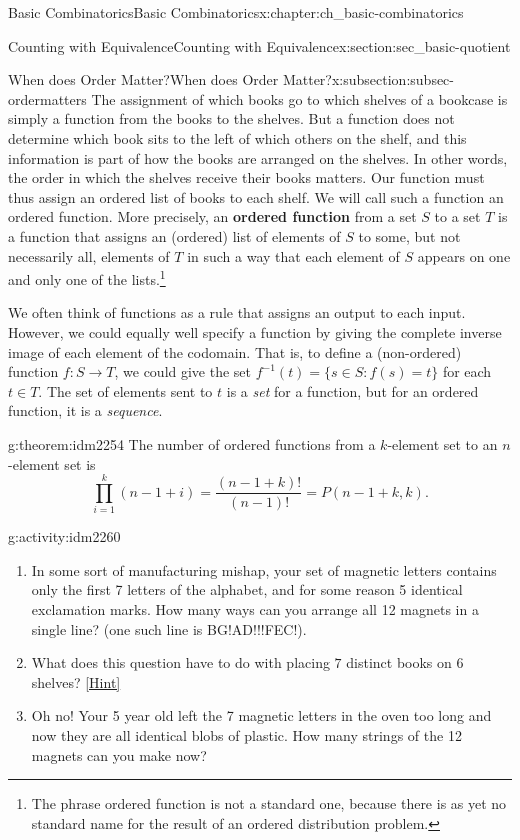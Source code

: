 \documentclass[oneside,10pt,]{book}
\newcommand{\terminology}[1]{\textbf{#1}}
\numberwithin{equation}{chapter}
\def\inv{^{-1}}
\def\st{:}
\begin{document}
\begin{chapterptx}{Basic Combinatorics}{}{Basic Combinatorics}{}{}{x:chapter:ch_basic-combinatorics}
\begin{sectionptx}{Counting with Equivalence}{}{Counting with Equivalence}{}{}{x:section:sec_basic-quotient}
\begin{subsectionptx}{When does Order Matter?}{}{When does Order Matter?}{}{}{x:subsection:subsec-ordermatters}
The assignment of which books go to which shelves of a bookcase is simply a function from the books to the shelves. But a function does not determine which book sits to the left of which others on the shelf, and this information is part of how the books are arranged on the shelves. In other words, the order in which the shelves receive their books matters.  Our function must thus assign an ordered list of books to each shelf. We will call such a function an ordered function. More precisely, an \terminology{ordered function} from a set \(S\) to a set \(T\) is a function that assigns an (ordered) list of elements of \(S\) to some, but not necessarily all, elements of \(T\) in such a way that each element of \(S\) appears on one and only one of the lists.\footnote{The phrase ordered function is not a standard one, because there is as yet no standard name for the result of an ordered distribution problem.\label{g:fn:idm2246}}%
\par
We often think of functions as a rule that assigns an output to each input.  However, we could equally well specify a function by giving the complete inverse image of each element of the codomain.  That is, to define a (non-ordered) function \(f:S \to T\), we could give the set \(f\inv(t) = \{s \in S \st f(s) = t\}\) for each \(t \in T\).  The set of elements sent to \(t\) is a \emph{set} for a function, but for an ordered function, it is a \emph{sequence}.%
\begin{theorem}{}{}{g:theorem:idm2254}%
The number of ordered functions from a \(k\)-element set to an \(n\)-element set is%
\begin{equation*}
\prod_{i=1}^k (n-1+i) = \frac{(n-1+k)!}{(n-1)!} = P(n-1+k, k).
\end{equation*}
%
\end{theorem}
\begin{activity}{}{g:activity:idm2260}%
\begin{enumerate}[font=\bfseries,label=(\alph*),ref=\alph*]
\item{}In some sort of manufacturing mishap, your set of magnetic letters contains only the first 7 letters of the alphabet, and for some reason 5 identical exclamation marks.  How many ways can you arrange all 12 magnets in a single line?  (one such line is BG!AD!!!FEC!).%
\item{}What does this question have to do with placing \(7\) distinct books on \(6\) shelves?%
\space\hspace*{0pt}\hfill{\tiny\hyperlink{g:hint:idm2276-back}{[Hint]}}\item{}Oh no! Your 5 year old left the 7 magnetic letters in the oven too long and now they are all identical blobs of plastic.  How many strings of the 12 magnets can you make now?%

\end{enumerate}
\end{activity}
\end{subsectionptx}
\end{sectionptx}
\end{chapterptx}
\end{document}

